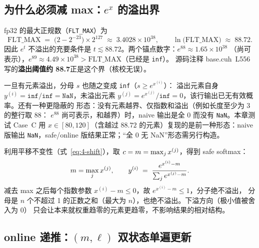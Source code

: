 \subsection{为什么必须减 max：$e^{x}$ 的溢出界}

fp32 的最大正规数（\texttt{FLT\_MAX}）为
\begin{equation}
  \mathrm{FLT\_MAX} \;=\; \bigl(2 - 2^{-23}\bigr) \times 2^{127}
  \;\approx\; 3.4028 \times 10^{38},
  \qquad
  \ln\bigl(\mathrm{FLT\_MAX}\bigr) \;\approx\; 88.72 .
  \label{eq:4-fltmax}
\end{equation}
因此 $e^{t}$ 不溢出的充要条件是 $t \lesssim 88.72$。两个锚点数字：$e^{88} \approx 1.65\times 10^{38}$
（尚可表示），$e^{89} \approx 4.49\times 10^{38} > \mathrm{FLT\_MAX}$（已经是 \texttt{inf}）。
源码注释 base.cuh~L556 写的\textbf{溢出阈值约 88.7}正是这个界（核校无误）。

一旦有元素溢出，分母 $s$ 也随之变成 \texttt{inf}（$s \ge e^{x^{(i)}}$）：
溢出元素自身 $y^{(i)} = \texttt{inf}/\texttt{inf} = \texttt{NaN}$，未溢出元素
$y^{(j)} = e^{x^{(j)}}/\texttt{inf} = 0$，该行输出已无有效概率。还有一种更隐蔽的
形态：没有元素越界、仅指数和溢出（例如长度至少为 $3$ 的整行取 $88$：
$e^{88}$ 尚可表示，和越界）时，naive 输出是全 0 而没有 \texttt{NaN}。本章测试
Case~C 用 $x \in [80, 120]$（含越过 $88.72$ 的元素）复现的是前一种形态：naive 版输出
\texttt{NaN}，safe/online 版结果正常；``全 0 无 NaN''形态需另行构造。

利用平移不变性（式~\ref{eq:4-shift}），取 $c = m = \max\sb{j} x^{(j)}$，得到 safe softmax：
\begin{equation}
  m = \max\sb{j} x^{(j)},
  \qquad
  y^{(i)} \;=\; \frac{e^{x^{(i)} - m}}{\sum\sb{j} e^{x^{(j)} - m}} .
  \label{eq:4-safe}
\end{equation}
减去 max 之后每个指数参数 $x^{(i)} - m \le 0$，故 $e^{x^{(i)} - m} \le 1$，分子绝不溢出，
分母是 $n$ 个不超过 1 的正数之和（最大为 $n$），也绝不溢出。下溢方向（极小值被舍入为 0）
只会让本来就权重趋零的元素更趋零，不影响结果的相对结构。

\subsection{online 递推：$(m, \ell)$ 双状态单遍更新}

